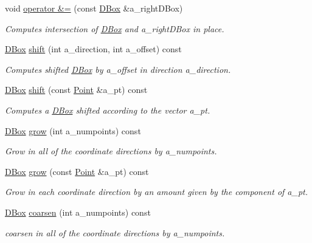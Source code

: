 \begin{DoxyCompactItemize}
void \hyperlink{class_d_box_a98da582f742e5e82bdbb740533cc959b}{operator \&=} (const \hyperlink{class_d_box}{D\+Box} \&a\+\_\+right\+D\+Box)
\begin{DoxyCompactList}\small\item\em Computes intersection of \hyperlink{class_d_box}{D\+Box} and a\+\_\+right\+D\+Box in place. \end{DoxyCompactList}\item 
\hyperlink{class_d_box}{D\+Box} \hyperlink{class_d_box_a62403e537be588d0af273cb9d84e089c}{shift} (int a\+\_\+direction, int a\+\_\+offset) const
\begin{DoxyCompactList}\small\item\em Computes shifted \hyperlink{class_d_box}{D\+Box} by a\+\_\+offset in direction a\+\_\+direction. \end{DoxyCompactList}\item 
\hyperlink{class_d_box}{D\+Box} \hyperlink{class_d_box_ad01e33bf0839296a79a315c4dc17f97c}{shift} (const \hyperlink{class_point}{Point} \&a\+\_\+pt) const
\begin{DoxyCompactList}\small\item\em Computes a \hyperlink{class_d_box}{D\+Box} shifted according to the vector a\+\_\+pt. \end{DoxyCompactList}\item 
\hyperlink{class_d_box}{D\+Box} \hyperlink{class_d_box_a390a8b999c556c217cb1f0297691180a}{grow} (int a\+\_\+numpoints) const
\begin{DoxyCompactList}\small\item\em Grow in all of the coordinate directions by a\+\_\+numpoints. \end{DoxyCompactList}\item 
\hyperlink{class_d_box}{D\+Box} \hyperlink{class_d_box_aa764549d6adab28f06409cd769c6b07e}{grow} (const \hyperlink{class_point}{Point} \&a\+\_\+pt) const
\begin{DoxyCompactList}\small\item\em Grow in each coordinate direction by an amount given by the component of a\+\_\+pt. \end{DoxyCompactList}\item 
\hyperlink{class_d_box}{D\+Box} \hyperlink{class_d_box_a0c5ff6539cfad2c35554507a4094a663}{coarsen} (int a\+\_\+numpoints) const
\begin{DoxyCompactList}\small\item\em coarsen in all of the coordinate directions by a\+\_\+numpoints. \end{DoxyCompactList}\item 

\end{DoxyCompactItemize}
